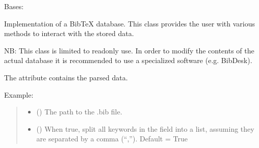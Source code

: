 \documentclass[letterpaper,10pt,english]{sphinxmanual}
\begin{document}
\begin{fulllineitems}
\label{\detokenize{generated/bp_text.database:bp_text.database.BibTexDatabase}}
\pysigstartsignatures
\pysiglinewithargsret
{}
{\sphinxparamcomma {}\sphinxparamcomma {}}
{}
\pysigstopsignatures
\sphinxAtStartPar
Bases: {\hyperref[\detokenize{generated/bp_text.database:bp_text.database.Database}]{}}

\sphinxAtStartPar
Implementation of a BibTeX database.  This class provides the user with
various methods to interact with the stored data.

\sphinxAtStartPar
NB: This class is limited to read\sphinxhyphen{}only use.  In order to modify the contents
of the actual database it is recommended to use a specialized software (e.g.
BibDesk).

\sphinxAtStartPar
The  attribute contains the parsed data.

\sphinxAtStartPar
Example:

\begin{sphinxVerbatim}[commandchars=\\\{\}]
  
\PYG{p}{[}\PYG{p}{]}
\end{sphinxVerbatim}
\begin{quote}\begin{description}
\begin{itemize}
\item {} 
\sphinxAtStartPar
{} () \textendash{} The path to the .bib file.

\item {} 
\sphinxAtStartPar
{} () \textendash{} When true, split all keywords in the 
field into a list, assuming they are separated by a comma (“,”).
Default = True


\end{itemize}
\end{description}
\end{quote}
\end{fulllineitems}
\end{document}
